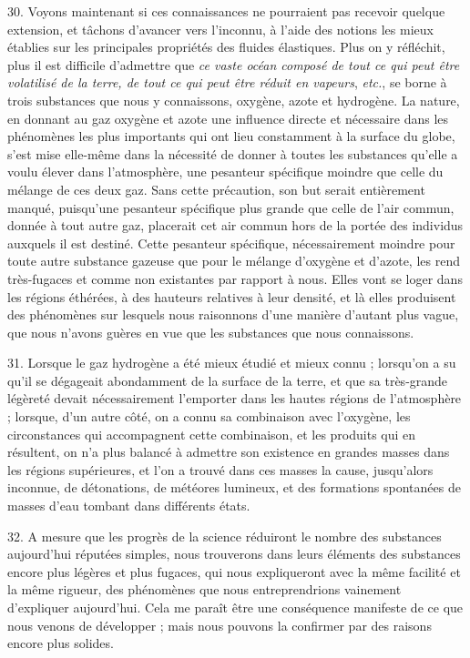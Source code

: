 \documentclass[a4paper, 11pt, oneside, polutonikogreek, french]{article}
\begin{document}
30. Voyons maintenant si ces connaissances ne pourraient pas recevoir quelque extension, et tâchons d'avancer vers l'inconnu, à l'aide des notions les mieux établies sur les principales propriétés des fluides élastiques. Plus on y réfléchit, plus il est difficile d'admettre que \emph{ce vaste océan composé de tout ce qui peut être volatilisé de la terre, de tout ce qui peut être réduit en vapeurs}, \emph{etc.}, se borne à trois substances que nous y connaissons, oxygène, azote et hydrogène. La nature, en donnant au gaz oxygène et azote une influence directe et nécessaire dans les phénomènes les plus importants qui ont lieu constamment à la surface du globe, s'est mise elle-même dans la nécessité de donner à toutes les substances qu'elle a voulu élever dans l'atmosphère, une pesanteur spécifique moindre que celle du mélange de ces deux gaz. Sans cette précaution, son but serait entièrement manqué, puisqu'une pesanteur spécifique plus grande que celle de l'air commun, donnée à tout autre gaz, placerait cet air commun hors de la portée des individus auxquels il est destiné. Cette pesanteur spécifique, nécessairement moindre pour toute autre substance gazeuse que pour le mélange d'oxygène et d'azote, les rend très-fugaces et comme non existantes par rapport à nous. Elles vont se loger dans les régions éthérées, à des hauteurs relatives à leur densité, et là elles produisent des phénomènes sur lesquels nous raisonnons d'une manière d'autant plus vague, que nous n'avons guères en vue que les substances que nous connaissons.

31. Lorsque le gaz hydrogène a été mieux étudié et mieux connu ; lorsqu'on a su qu'il se dégageait abondamment de la surface de la terre, et que sa très-grande légèreté devait nécessairement l'emporter dans les hautes régions de l'atmosphère ; lorsque, d'un autre côté, on a connu sa combinaison avec l'oxygène, les circonstances qui accompagnent cette combinaison, et les produits qui en résultent, on n'a plus balancé à admettre son existence en grandes masses dans les régions supérieures, et l'on a trouvé dans ces masses la cause, jusqu'alors inconnue, de détonations, de météores lumineux, et des formations spontanées de masses d'eau tombant dans différents états.

32. A mesure que les progrès de la science réduiront le nombre des substances aujourd'hui réputées simples, nous trouverons dans leurs éléments des substances encore plus légères et plus fugaces, qui nous expliqueront avec la même facilité et la même rigueur, des phénomènes que nous entreprendrions vainement d'expliquer aujourd'hui. Cela me paraît être une conséquence manifeste de ce que nous venons de développer ; mais nous pouvons la confirmer par des raisons encore plus solides.
\end{document}

